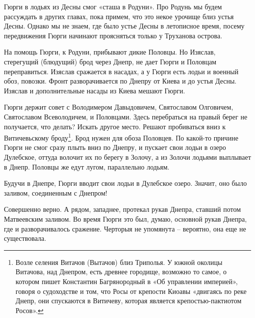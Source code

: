 Гюрги в лодьях из Десны смог «сташа в Родуни». Про Родунь мы будем рассуждать в других главах, пока примем, что это некое урочище близ устья Десны. Однако мы не знаем, где было устье Десны в летописное время, посему передвижения Гюрги начинают проясняться только у Труханова острова.

На помощь Гюрги, к Родуни, прибывают дикие Половцы. Но Изяслав, стерегущий (блюдущий) брод через Днепр, не дает Гюрги и Половцам переправиться. Изяслав сражается в насадах, а у Гюрги есть лодьи и военный обоз, повозки. Фронт разворачивается по Днепру от Киева и до устья Десны. Изяслав и дополнительные насады из Киева мешают Гюрги.



Гюрги держит совет с Володимером Давыдовичем, Святославом Олговичем, Святославом Всеволодичем, и Половцами. Здесь перебраться на правый берег не получается, что делать? Искать другое место. Решают пробиваться вниз к Витичевьскому броду\footnote{Возле селения Витачов (Вытачов) близ Триполья. У южной околицы Витачова, над Днепром, есть древнее городище, возможно то самое, о котором пишет Константин Багрянородный в «Об управлении империей», говоря о судоходстве и том, что Росы от крепости Киоавы «двигаясь по реке Днепр, они спускаются в Витичеву, которая является крепостью-пактиотом Росов».}. Брод нужен для обоза Половцев. По какой-то причине Гюрги не смог сразу плыть вниз по Днепру, и пускает свои лодьи в озеро Дулебское, оттуда волочит их по берегу в Золочу, а из Золочи лодьями выплывает в Днепр. Половцы же едут лугом, параллельно лодьям.

Будучи в Днепре, Гюрги вводит свои лодьи в Дулебское озеро. Значит, оно было заливом, соединенным с Днепром!

Совершенно верно. А рядом, западнее, протекал рукав Днепра, ставший потом Матвеевским заливом. Во время Гюрги это был, думаю, основной рукав Днепра, где и разворачивалось сражение. Черторыя не упомянута – вероятно, она еще не существовала.

